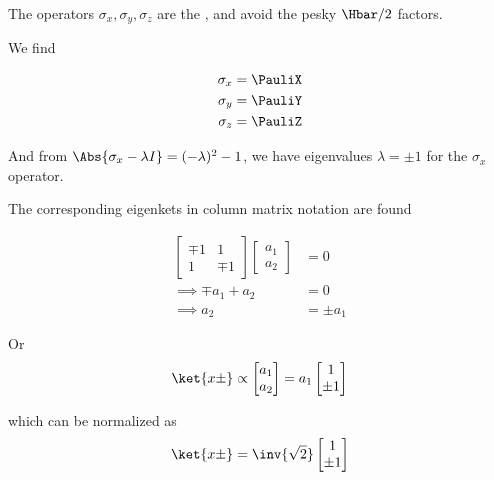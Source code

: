 The operators \(\sigma_x, \sigma_y, \sigma_z\) are the , and avoid the pesky \(\Hbar/2\) factors.

We find

\begin{equation}\label{eqn:PHY356Foct19:2010}
\begin{aligned}
\sigma_x &= \PauliX \\
\sigma_y &= \PauliY \\
\sigma_z &= \PauliZ
\end{aligned}
\end{equation}

And from \(\Abs{\sigma_x - \lambda I} = (-\lambda)^2 -1\), we have eigenvalues \(\lambda = \pm 1\) for the \(\sigma_x\) operator.

The corresponding eigenkets in column matrix notation are found

\begin{equation}\label{eqn:lecture6OrbitalandIntrinsicMomentum:2200}
\begin{aligned}
\begin{bmatrix}
\mp 1 & 1 \\
1 & \mp 1
\end{bmatrix}
\begin{bmatrix}
a_1 \\
a_2
\end{bmatrix}
&= 0 \\
\implies
\mp a_1 + a_2 &= 0 \\
\implies
a_2 &= \pm a_1
\end{aligned}
\end{equation}

Or
\begin{equation}\label{eqn:lecture6OrbitalandIntrinsicMomentum:2220}
\ket{x\pm} \propto
\begin{bmatrix}
a_1 \\
a_2
\end{bmatrix}
=
a_1
\begin{bmatrix}
1 \\
\pm 1
\end{bmatrix}
\end{equation}

which can be normalized as
\begin{equation}\label{eqn:PHY356Foct19:2011}
\ket{x\pm} =
\inv{\sqrt{2}}
\begin{bmatrix}
1 \\
\pm 1
\end{bmatrix}
\end{equation}

